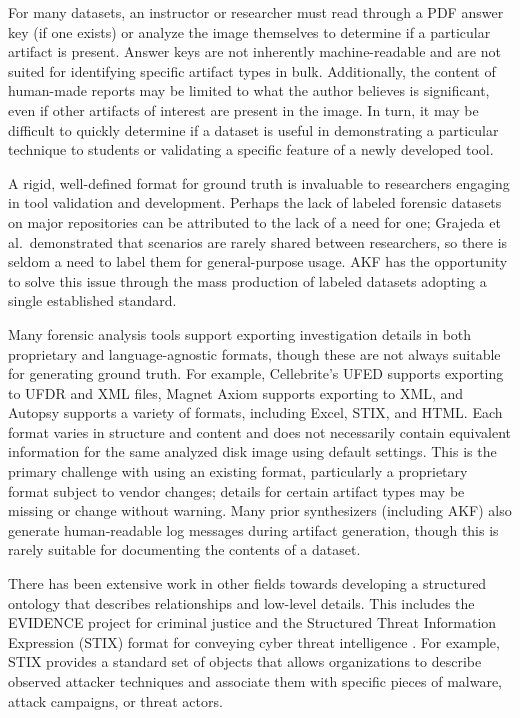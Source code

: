 \documentclass[letterpaper,12pt]{report}
\begin{document}
For many datasets, an instructor or researcher must read through a PDF
answer key (if one exists) or analyze the image themselves to determine
if a particular artifact is present. Answer keys are not inherently
machine-readable and are not suited for identifying specific artifact
types in bulk. Additionally, the content of human-made reports may be
limited to what the author believes is significant, even if other
artifacts of interest are present in the image. In turn, it may be
difficult to quickly determine if a dataset is useful in demonstrating a
particular technique to students or validating a specific feature of a
newly developed tool.

A rigid, well-defined format for ground truth is invaluable to
researchers engaging in tool validation and development. Perhaps the
lack of labeled forensic datasets on major repositories can be
attributed to the lack of a need for one; Grajeda et al.~demonstrated
that scenarios are rarely shared between researchers, so there is seldom
a need to label them for general-purpose usage. AKF has the opportunity
to solve this issue through the mass production of labeled datasets
adopting a single established standard.

Many forensic analysis tools support exporting investigation details in
both proprietary and language-agnostic formats, though these are not
always suitable for generating ground truth. For example, Cellebrite's
UFED supports exporting to UFDR and XML files, Magnet Axiom supports
exporting to XML, and Autopsy supports a variety of formats, including
Excel, STIX, and HTML. Each format varies in structure and content and
does not necessarily contain equivalent information for the same
analyzed disk image using default settings. This is the primary
challenge with using an existing format, particularly a proprietary
format subject to vendor changes; details for certain artifact types may
be missing or change without warning. Many prior synthesizers (including
AKF) also generate human-readable log messages during artifact
generation, though this is rarely suitable for documenting the contents
of a dataset.

There has been extensive work in other fields towards developing a
structured ontology that describes relationships and low-level details.
This includes the EVIDENCE project for criminal justice and the
Structured Threat Information Expression (STIX) format for conveying
cyber threat intelligence
\cite{caseyLeveragingCybOXStandardize2015}. For example, STIX
provides a standard set of objects that allows organizations to describe
observed attacker techniques and associate them with specific pieces of
malware, attack campaigns, or threat actors.
\end{document}
